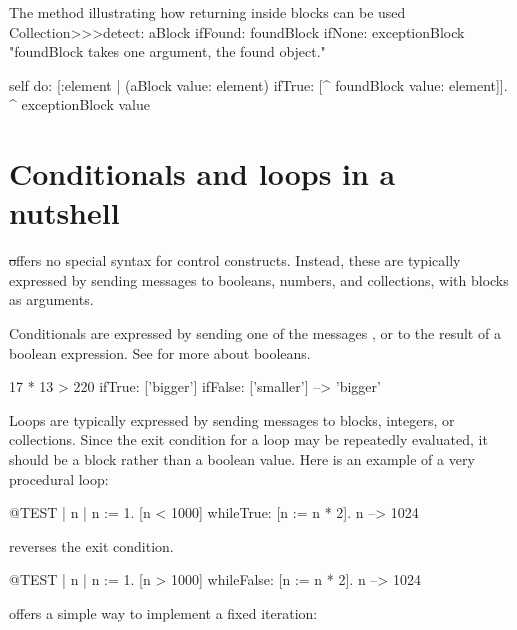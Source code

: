 \documentclass[a4paper,10pt,twoside]{book}
\begin{document}
\begin{method}[detectReturnBlock]{The method  illustrating how returning inside blocks can be used}
Collection>>>detect: aBlock ifFound: foundBlock ifNone: exceptionBlock 
   "foundBlock takes one argument, the found object."

   self do: [:element | 
      (aBlock value: element) ifTrue: [^ foundBlock value: element]].
   ^ exceptionBlock value
\end{method}


\section{Conditionals and loops in a nutshell}

\st offers no special syntax for control constructs.
Instead, these are typically expressed by sending messages to booleans, numbers, and collections, with blocks as arguments.

Conditionals are expressed by sending one of the messages ,  or  to the result of a boolean expression.
See  for more about booleans.

\begin{code}{}
17 * 13 > 220
   ifTrue: ['bigger']
   ifFalse: ['smaller'] --> 'bigger'
\end{code}

Loops are typically expressed by sending messages to blocks, integers, or collections.
Since the exit condition for a loop may be repeatedly evaluated, it should be a block rather than a boolean value.
Here is an example of a very procedural loop:

\begin{code}{@TEST | n |}
n := 1.
[n < 1000] whileTrue: [n := n * 2].
n --> 1024
\end{code}

\noindent
{} reverses the exit condition.
\begin{code}{@TEST | n |}
n := 1.
[n > 1000] whileFalse: [n := n * 2].
n --> 1024
\end{code}

\noindent
{} offers a simple way to implement a fixed iteration:
\end{document}
